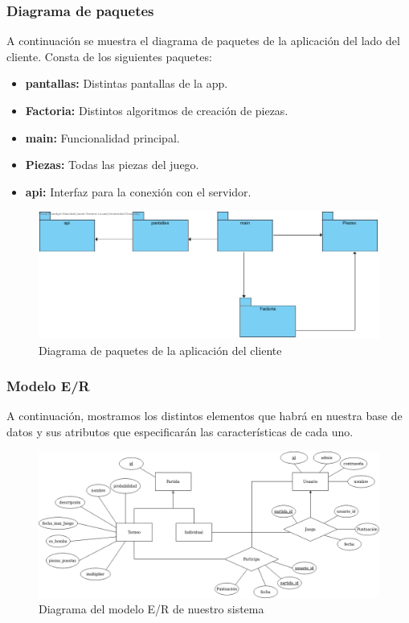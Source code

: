 \documentclass{article}
\begin{document}
\subsubsection{Diagrama de paquetes}
A continuación se muestra el diagrama de paquetes de la aplicación del lado del cliente. Consta de los siguientes paquetes:

\begin{itemize}
  \item \textbf{pantallas: }Distintas pantallas de la app.
  \item \textbf{Factoria: }Distintos algoritmos de creación de piezas.
  \item \textbf{main: }Funcionalidad principal.
  \item \textbf{Piezas: }Todas las piezas del juego.
  \item \textbf{api: }Interfaz para la conexión con el servidor.
\end{itemize}

\begin{figure}[H]
  \includegraphics[width=\textwidth]{imagenes/DiagramaPaquetes2.jpg}
  \caption{Diagrama de paquetes de la aplicación del cliente} 
\end{figure} 

\subsubsection{Modelo E/R}
A continuación, mostramos los distintos elementos que habrá en nuestra base de datos y sus atributos que especificarán las características de cada uno.
\begin{figure}[H]
  \includegraphics[width=\textwidth]{imagenes/er.png}
  \caption{Diagrama del modelo E/R de nuestro sistema} 
\end{figure} 
\end{document}
